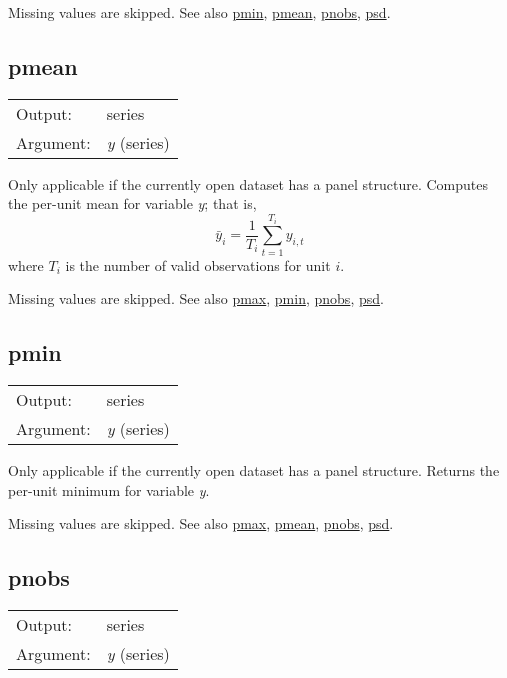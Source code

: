 	  Missing values are skipped. 
	  See also \hyperlink{func-pmin}{pmin}, \hyperlink{func-pmean}{pmean}, \hyperlink{func-pnobs}{pnobs}, \hyperlink{func-psd}{psd}.

\subsection{pmean}
\hypertarget{func-pmean}{}

\begin{tabular}{ll}
Output:     & series\\
Argument:   & \textsl{y} (series)\\
\end{tabular}

	  Only applicable if the currently open dataset has a panel
	  structure. Computes the per-unit mean for variable
	  \textsl{y}; that is, 
	  \[ \bar{y}_i = \frac{1}{T_i} \sum_{t=1}^{T_i} y_{i,t}\] 
	  where $T_i$ is the number of valid
	  observations for unit $i$.

	  Missing values are skipped. 
	  See also \hyperlink{func-pmax}{pmax}, \hyperlink{func-pmin}{pmin}, \hyperlink{func-pnobs}{pnobs}, \hyperlink{func-psd}{psd}.
\subsection{pmin}
\hypertarget{func-pmin}{}

\begin{tabular}{ll}
Output:     & series\\
Argument:   & \textsl{y} (series)\\
\end{tabular}

	  Only applicable if the currently open dataset has a panel
	  structure. Returns the per-unit minimum for variable
	  \textsl{y}.

	  Missing values are skipped. 
	  See also \hyperlink{func-pmax}{pmax}, \hyperlink{func-pmean}{pmean}, \hyperlink{func-pnobs}{pnobs}, \hyperlink{func-psd}{psd}.

\subsection{pnobs}
\hypertarget{func-pnobs}{}

\begin{tabular}{ll}
Output:     & series\\
Argument:   & \textsl{y} (series)\\
\end{tabular}

